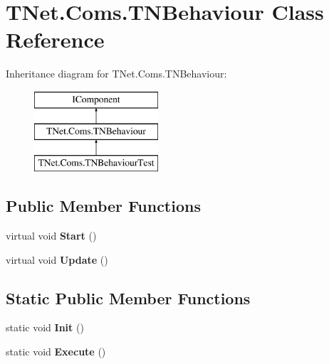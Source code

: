 \hypertarget{class_t_net_1_1_coms_1_1_t_n_behaviour}{}\section{T\+Net.\+Coms.\+T\+N\+Behaviour Class Reference}
\label{class_t_net_1_1_coms_1_1_t_n_behaviour}
Inheritance diagram for T\+Net.\+Coms.\+T\+N\+Behaviour\+:\begin{figure}[H]
\begin{center}
\leavevmode
\includegraphics[height=3.000000cm]{class_t_net_1_1_coms_1_1_t_n_behaviour}
\end{center}
\end{figure}
\subsection*{Public Member Functions}
\begin{DoxyCompactItemize}
\item 
\mbox{\label{class_t_net_1_1_coms_1_1_t_n_behaviour_aa0de2c0901e00c29654ec9204ce6824c}} 
virtual void {\bfseries Start} ()
\item 
\mbox{\label{class_t_net_1_1_coms_1_1_t_n_behaviour_a33a316f7e12233d369059231877b62d9}} 
virtual void {\bfseries Update} ()
\end{DoxyCompactItemize}
\subsection*{Static Public Member Functions}
\begin{DoxyCompactItemize}
\item 
\mbox{\label{class_t_net_1_1_coms_1_1_t_n_behaviour_af5d29834e7295c3295250f437044f654}} 
static void {\bfseries Init} ()
\item 
\mbox{\label{class_t_net_1_1_coms_1_1_t_n_behaviour_aa6baf46b7d99c37e4f4ec22a9efdc29a}} 
static void {\bfseries Execute} ()
\end{DoxyCompactItemize}
